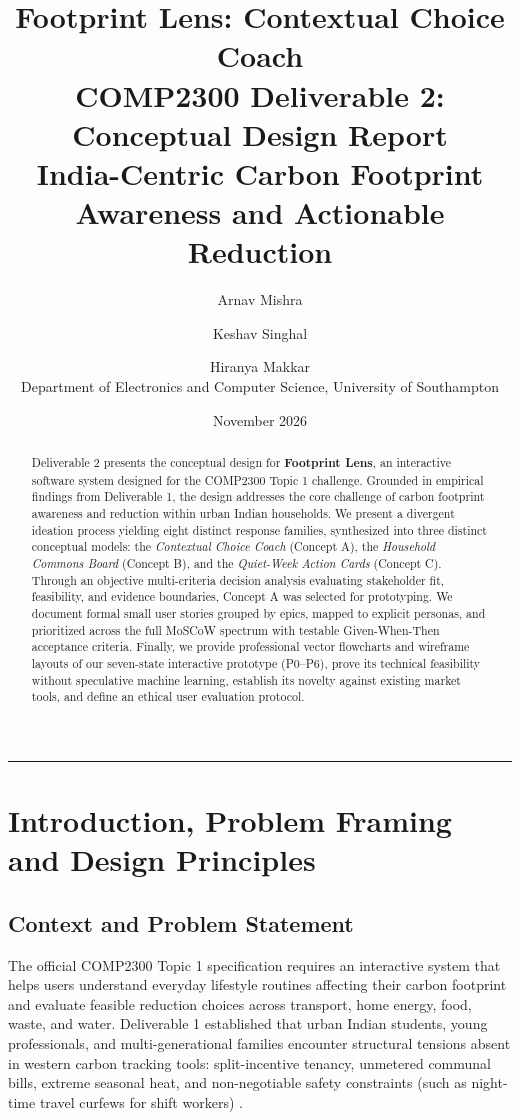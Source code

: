 \documentclass[12pt,a4paper]{article}
\title{\textbf{Footprint Lens: Contextual Choice Coach}\\[0.4em]
  \large COMP2300 Deliverable 2: Conceptual Design Report\\
  \normalsize India-Centric Carbon Footprint Awareness and Actionable Reduction}
\author{Arnav Mishra \and Keshav Singhal \and Hiranya Makkar\\[0.4em]
  \small Department of Electronics and Computer Science, University of Southampton}
\date{November 2026}
\begin{document}
\maketitle

\begin{abstract}
\noindent Deliverable 2 presents the conceptual design for \textbf{Footprint Lens}, an interactive software system designed for the COMP2300 Topic 1 challenge. Grounded in empirical findings from Deliverable 1, the design addresses the core challenge of carbon footprint awareness and reduction within urban Indian households. We present a divergent ideation process yielding eight distinct response families, synthesized into three distinct conceptual models: the \emph{Contextual Choice Coach} (Concept A), the \emph{Household Commons Board} (Concept B), and the \emph{Quiet-Week Action Cards} (Concept C). Through an objective multi-criteria decision analysis evaluating stakeholder fit, feasibility, and evidence boundaries, Concept A was selected for prototyping. We document formal small user stories grouped by epics, mapped to explicit personas, and prioritized across the full MoSCoW spectrum with testable Given-When-Then acceptance criteria. Finally, we provide professional vector flowcharts and wireframe layouts of our seven-state interactive prototype (P0--P6), prove its technical feasibility without speculative machine learning, establish its novelty against existing market tools, and define an ethical user evaluation protocol.
\end{abstract}

\hrule
\vspace{0.8em}

\section{Introduction, Problem Framing and Design Principles}

\subsection{Context and Problem Statement}
The official COMP2300 Topic 1 specification requires an interactive system that helps users understand everyday lifestyle routines affecting their carbon footprint and evaluate feasible reduction choices across transport, home energy, food, waste, and water. Deliverable 1 established that urban Indian students, young professionals, and multi-generational families encounter structural tensions absent in western carbon tracking tools: split-incentive tenancy, unmetered communal bills, extreme seasonal heat, and non-negotiable safety constraints (such as night-time travel curfews for shift workers) \cite{lee2021}. 
\end{document}
